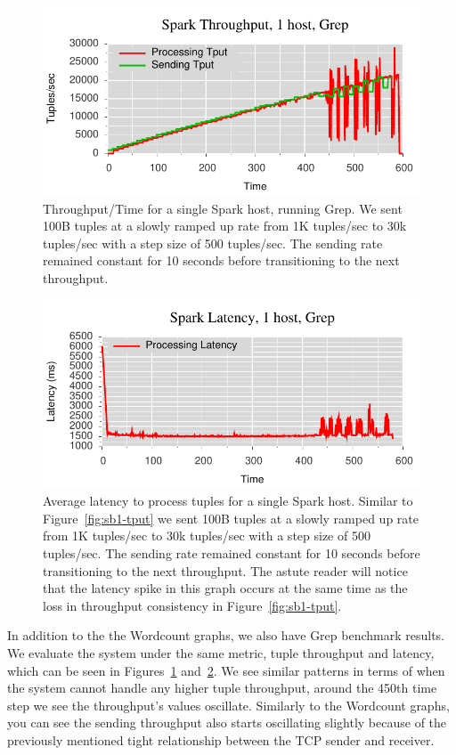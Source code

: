 \begin{figure}[t]
\centering
\includegraphics[width=1\linewidth]{figures/sp2_tput.pdf}
\caption{Throughput/Time for a single Spark host, running Grep. We sent 100B tuples at a
slowly ramped up rate from 1K tuples/sec to 30k tuples/sec with a step size of
500 tuples/sec. The sending rate remained constant for 10 seconds before
transitioning to the next throughput.}
\label{fig:sp2-tput}
\end{figure}

\begin{figure}[t]
\centering
\includegraphics[width=1\linewidth]{figures/sp2_latency.pdf}
\caption{Average latency to process tuples for a single Spark host. Similar to
Figure~\ref{fig:sb1-tput} we sent 100B tuples at a slowly ramped up rate from 1K
tuples/sec to 30k tuples/sec with a step size of 500 tuples/sec. The sending
rate remained constant for 10 seconds before transitioning to the next
throughput. The astute reader will notice that the latency spike in this graph
occurs at the same time as the loss in throughput consistency in
Figure~\ref{fig:sb1-tput}.}
\label{fig:sp2-latency}
\end{figure}

In addition to the the Wordcount graphs, we also have Grep benchmark
results.  We evaluate the system under the same metric, tuple throughput and
latency, which can be seen in Figures~\ref{fig:sp2-tput}
and~\ref{fig:sp2-latency}. We see similar patterns in terms of when the system
cannot handle any higher tuple throughput, around the 450th time step we see
the throughput's values oscillate. Similarly to the Wordcount graphs, you can
see the sending throughput also starts oscillating slightly because of the
previously mentioned tight relationship between the TCP sender and receiver.

